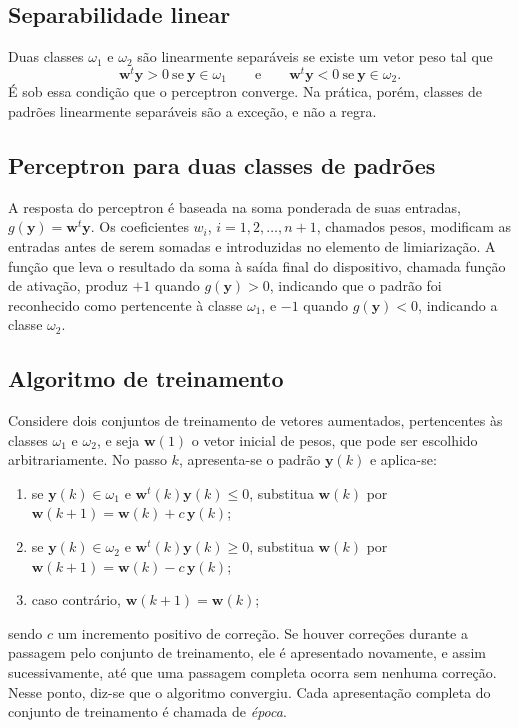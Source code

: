 \documentclass[12pt,a4paper]{article}
\begin{document}
\subsection{Separabilidade linear}

Duas classes $\omega_1$ e $\omega_2$ são linearmente separáveis se existe um vetor peso tal que
\begin{equation}
  \mathbf{w}^t\mathbf{y} > 0 \ \text{se}\ \mathbf{y} \in \omega_1
  \qquad\text{e}\qquad
  \mathbf{w}^t\mathbf{y} < 0 \ \text{se}\ \mathbf{y} \in \omega_2.
  \label{eq:separavel}
\end{equation}
É sob essa condição que o perceptron converge. Na prática, porém, classes de padrões linearmente separáveis são a exceção, e não a regra.

\subsection{Perceptron para duas classes de padrões}

A resposta do perceptron é baseada na soma ponderada de suas entradas, $g(\mathbf{y}) = \mathbf{w}^t\mathbf{y}$. Os coeficientes $w_i$, $i = 1, 2, \dots, n+1$, chamados pesos, modificam as entradas antes de serem somadas e introduzidas no elemento de limiarização. A função que leva o resultado da soma à saída final do dispositivo, chamada função de ativação, produz $+1$ quando $g(\mathbf{y}) > 0$, indicando que o padrão foi reconhecido como pertencente à classe $\omega_1$, e $-1$ quando $g(\mathbf{y}) < 0$, indicando a classe $\omega_2$.

\subsection{Algoritmo de treinamento}\label{sec:algoritmo}

Considere dois conjuntos de treinamento de vetores aumentados, pertencentes às classes $\omega_1$ e $\omega_2$, e seja $\mathbf{w}(1)$ o vetor inicial de pesos, que pode ser escolhido arbitrariamente. No passo $k$, apresenta-se o padrão $\mathbf{y}(k)$ e aplica-se:
\begin{enumerate}
  \item[i)] se $\mathbf{y}(k) \in \omega_1$ e $\mathbf{w}^t(k)\mathbf{y}(k) \leq 0$, substitua $\mathbf{w}(k)$ por $\mathbf{w}(k+1) = \mathbf{w}(k) + c\,\mathbf{y}(k)$;
  \item[ii)] se $\mathbf{y}(k) \in \omega_2$ e $\mathbf{w}^t(k)\mathbf{y}(k) \geq 0$, substitua $\mathbf{w}(k)$ por $\mathbf{w}(k+1) = \mathbf{w}(k) - c\,\mathbf{y}(k)$;
  \item[iii)] caso contrário, $\mathbf{w}(k+1) = \mathbf{w}(k)$;
\end{enumerate}
sendo $c$ um incremento positivo de correção. Se houver correções durante a passagem pelo conjunto de treinamento, ele é apresentado novamente, e assim sucessivamente, até que uma passagem completa ocorra sem nenhuma correção. Nesse ponto, diz-se que o algoritmo convergiu. Cada apresentação completa do conjunto de treinamento é chamada de \emph{época}.
\end{document}
